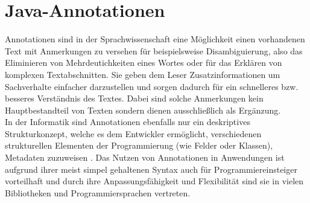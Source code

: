 \section{Java-Annotationen}
\label{java_annotationen}
\noindent Annotationen sind in der Sprachwissenschaft eine Möglichkeit einen vorhandenen Text mit Anmerkungen zu versehen für beispielsweise Disambiguierung, also das Eliminieren von Mehrdeutichkeiten eines Wortes oder für das Erklären von komplexen Textabschnitten. Sie geben dem Leser Zusatzinformationen um Sachverhalte einfacher darzustellen und sorgen dadurch für ein schnelleres bzw. besseres Verständnis des Textes. Dabei sind solche Anmerkungen kein Hauptbestandteil von Texten sondern dienen ausschließlich als Ergänzung.\\
In der Informatik sind Annotationen ebenfalls nur ein deskriptives Strukturkonzept, welche es dem Entwickler ermöglicht, verschiedenen strukturellen Elementen der Programmierung (wie Felder oder Klassen), Metadaten zuzuweisen \cite{Yu2019}. Das Nutzen von Annotationen in Anwendungen ist aufgrund ihrer meist simpel gehaltenen Syntax auch für Programmiereinsteiger vorteilhaft und durch ihre Anpassungsfähigkeit und Flexibilität sind sie in vielen Bibliotheken und Programmiersprachen vertreten.
